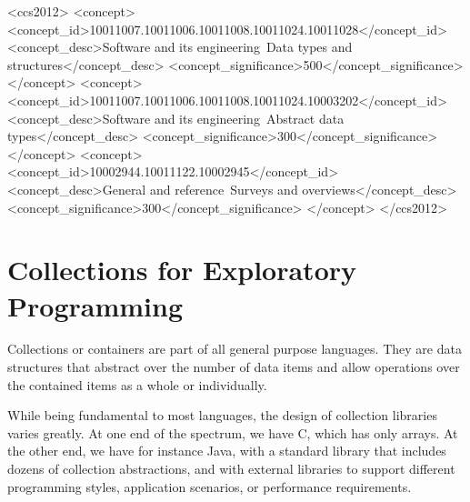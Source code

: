 \documentclass[sigconf, 10pt]{acmart}
\begin{document}
%
%
\begin{CCSXML}
<ccs2012>
<concept>
<concept_id>10011007.10011006.10011008.10011024.10011028</concept_id>
<concept_desc>Software and its engineering~Data types and structures</concept_desc>
<concept_significance>500</concept_significance>
</concept>
<concept>
<concept_id>10011007.10011006.10011008.10011024.10003202</concept_id>
<concept_desc>Software and its engineering~Abstract data types</concept_desc>
<concept_significance>300</concept_significance>
</concept>
<concept>
<concept_id>10002944.10011122.10002945</concept_id>
<concept_desc>General and reference~Surveys and overviews</concept_desc>
<concept_significance>300</concept_significance>
</concept>
</ccs2012>
\end{CCSXML}



\maketitle


\section{Collections for Exploratory Programming}


Collections or containers are part of all general purpose languages.
They are data structures that abstract over the number of data items
and allow operations over the contained items as a whole or individually.


While being fundamental to most languages,
the design of collection libraries varies greatly.
At one end of the spectrum, we have C, which has only arrays.
At the other end, we have for instance Java,
with a standard library that includes dozens of collection abstractions,
and with external libraries to support different programming styles,
application scenarios, or performance requirements.
\end{document}
